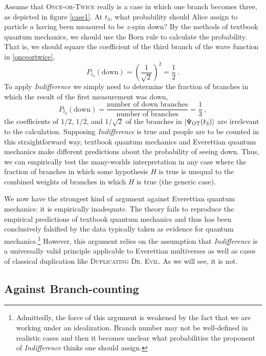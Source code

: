 \documentclass[12pt,onecolumn,secnumarabic,amsmath,amssymb,balancelastpage,nofootinbib]{article}
\newcommand{\ket}[1]{\ensuremath{\left|#1\right\rangle}}
\begin{document}
Assume that \textsc{Once-or-Twice} really is a case in which one branch becomes three, as depicted in figure \ref{case1}.  At $t_3$, what probability should Alice assign to particle $a$ having been measured to be $z$-spin down?  By the methods of textbook quantum mechanics, we should use the Born rule to calculate the probability.  That is, we should square the coefficient of the third branch of the wave function in \eqref{onceortwice},
\begin{equation}
P_{t_3}(\text{down})=\left(\frac{1}{\sqrt{2}}\right)^2=\frac{1}{2}\ .
\end{equation}
To apply \emph{Indifference} we simply need to determine the fraction of branches in which the result of the first measurement was down,
\begin{equation}
P_{t_3}(\text{down})=\frac{\text{number of down branches}}{\text{number of branches}}=\frac{1}{3}\ ,
\label{indifferencet3}
\end{equation}
the coefficients of $1/2$, $1/2$, and $1/\sqrt{2}$ of the branches in $\ket{\Psi_{\textsc{OT}}(t_3)}$ are irrelevant to the calculation.  Supposing \emph{Indifference} is true and people are to be counted in this straightforward way, textbook quantum mechanics and Everettian quantum mechanics make different predictions about the probability of seeing down.  Thus, we can empirically test the many-worlds interpretation in any case where the fraction of branches in which some hypothesis $H$ is true is unequal to the combined weights of branches in which $H$ is true (the generic case).

We now have the strongest kind of argument against Everettian quantum mechanics: it is empirically inadequate.  The theory fails to reproduce the empirical predictions of textbook quantum mechanics and thus has been conclusively falsified by the data typically taken as evidence for quantum mechanics.\footnote{Admittedly, the force of this argument is weakened by the fact that we are working under an idealization.  Branch number may not be well-defined in realistic cases and then it becomes unclear what probabilities the proponent of \emph{Indifference} thinks one should assign.}  However, this argument relies on the assumption that \emph{Indifference} is a universally valid principle applicable to Everettian multiverses as well as cases of classical duplication like \textsc{Duplicating Dr. Evil}.  As we will see, it is not.

\subsection{Against Branch-counting}\label{response}
\end{document}
